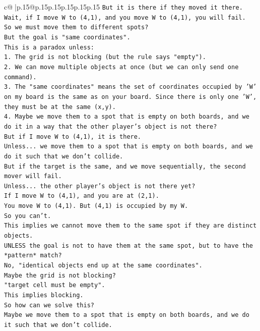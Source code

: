 \documentclass{article}
\begin{document}
{\begin{supertabular}{c@{$\;$}|p{.15\linewidth}@{}p{.15\linewidth}p{.15\linewidth}p{.15\linewidth}p{.15\linewidth}p{.15\linewidth}}
{{{\texttt{But it is there if they moved it there.} \\
\texttt{Wait, if I move W to (4,1), and you move W to (4,1), you will fail.} \\
\texttt{So we must move them to different spots?} \\
\texttt{But the goal is "same coordinates".} \\
\texttt{This is a paradox unless:} \\
\texttt{1. The grid is not blocking (but the rule says "empty").} \\
\texttt{2. We can move multiple objects at once (but we can only send one command).} \\
\texttt{3. The "same coordinates" means the set of coordinates occupied by 'W' on my board is the same as on your board. Since there is only one 'W', they must be at the same (x,y).} \\
\texttt{4. Maybe we move them to a spot that is empty on both boards, and we do it in a way that the other player's object is not there?} \\
\texttt{But if I move W to (4,1), it is there.} \\
\texttt{Unless... we move them to a spot that is empty on both boards, and we do it such that we don't collide.} \\
\texttt{But if the target is the same, and we move sequentially, the second mover will fail.} \\
\texttt{Unless... the other player's object is not there yet?} \\
\texttt{If I move W to (4,1), and you are at (2,1).} \\
\texttt{You move W to (4,1). But (4,1) is occupied by my W.} \\
\texttt{So you can't.} \\
\texttt{This implies we cannot move them to the same spot if they are distinct objects.} \\
\texttt{UNLESS the goal is not to have them at the same spot, but to have the *pattern* match?} \\
\texttt{No, "identical objects end up at the same coordinates".} \\
\texttt{Maybe the grid is not blocking?} \\
\texttt{"target cell must be empty".} \\
\texttt{This implies blocking.} \\
\texttt{So how can we solve this?} \\
\texttt{Maybe we move them to a spot that is empty on both boards, and we do it such that we don't collide.} \\
}}}
\end{supertabular}}
\end{document}
